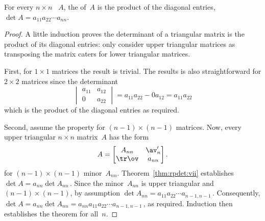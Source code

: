\begin{theorem}\label{thm:rpdet:vi} 
For every \(n\times n\) ~\(A\),
the  of~\(A\) is the product of the diagonal entries, \(\det A=a_{11}a_{22}\cdots a_{nn}\).
\end{theorem}
\begin{proof} 
A little induction proves the determinant of a triangular matrix is the product of its diagonal entries: only consider upper triangular matrices as transposing the matrix caters for lower triangular matrices.

First, for \(1\times 1\) matrices the result is trivial.
The results is also straightforward for \(2\times 2\) matrices since the determinant
\begin{equation*}
\begin{vmatrix} a_{11}&a_{12}\\0&a_{22} \end{vmatrix}
=a_{11}a_{22}-0a_{12}=a_{11}a_{22}
\end{equation*}
which is the product of the diagonal entries as required.

Second, assume the property for \((n-1)\times(n-1)\) matrices.
Now, every upper triangular \(n\times n\) matrix~\(A\) has the form
\begin{equation*}
A=\begin{bmatrix} A_{nn}&\av_n'\\\tr\ov&a_{nn} \end{bmatrix}.
\end{equation*}
for \((n-1)\times(n-1)\) minor~\(A_{nn}\).
Theorem~\ref{thm:rpdet:vii} establishes \(\det A=a_{nn}\det A_{nn}\)\,.  
Since the  minor~\(A_{nn}\) is upper triangular and \((n-1)\times(n-1)\), by assumption \(\det A_{nn}=a_{11}a_{22}\cdots a_{n-1,n-1}\)\,.
Consequently, \(\det A=a_{nn}\det A_{nn}=a_{nn}a_{11}a_{22}\cdots a_{n-1,n-1}\)\,, as required.
Induction then establishes the theorem for all~\(n\).
\end{proof}




